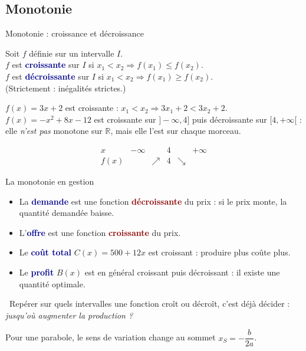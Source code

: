 \documentclass[aspectratio=169,11pt]{beamer}
\newcommand{\R}{\mathbb{R}}
\newcommand{\important}[1]{\textcolor{DarkRed}{\textbf{#1}}}
\newcommand{\key}[1]{\textcolor{DarkBlue}{\textbf{#1}}}
\begin{document}
\subsection{Monotonie}

\begin{frame}{Monotonie : croissance et décroissance}
	\begin{definitionbox}
		Soit $f$ définie sur un intervalle $I$.\\
		$f$ est \key{croissante} sur $I$ si $x_1<x_2\Rightarrow f(x_1)\le f(x_2)$.\\
		$f$ est \key{décroissante} sur $I$ si $x_1<x_2\Rightarrow f(x_1)\ge f(x_2)$.\\
		(Strictement : inégalités strictes.)
	\end{definitionbox}
	\begin{exemplebox}[Exemples]
		$f(x)=3x+2$ est croissante : $x_1<x_2\Rightarrow 3x_1+2<3x_2+2$.\\
		$f(x)=-x^2+8x-12$ est croissante sur $]-\infty,4]$ puis décroissante sur $[4,+\infty[$ : elle \emph{n'est pas} monotone sur $\R$, mais elle l'est sur chaque morceau.
	\end{exemplebox}
	\[
	\begin{array}{c|ccccc}
		x & -\infty & & 4 & & +\infty\\\hline
		f(x) & & \nearrow & 4 & \searrow &
	\end{array}
	\]
\end{frame}

\begin{frame}{La monotonie en gestion}
	\begin{itemize}
		\item La \key{demande} est une fonction \important{décroissante} du prix : si le prix monte, la quantité demandée baisse.
		\item L'\key{offre} est une fonction \important{croissante} du prix.
		\item Le \key{coût total} $C(x)=500+12x$ est croissant : produire plus coûte plus.
		\item Le \key{profit} $B(x)$ est en général croissant puis décroissant : il existe une quantité optimale.
	\end{itemize}
	\begin{applicationbox}
		\faLightbulb\ Repérer sur quels intervalles une fonction croît ou décroît, c'est déjà décider : \emph{jusqu'où augmenter la production ?}
	\end{applicationbox}
	\begin{attentionbox}[À retenir]
		Pour une parabole, le sens de variation change au sommet $x_S=-\dfrac{b}{2a}$.
	\end{attentionbox}
\end{frame}
\end{document}
